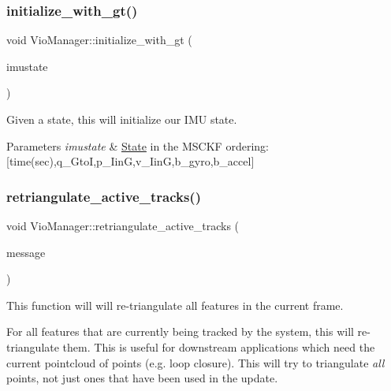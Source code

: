 \subsubsection{\texorpdfstring{initialize\+\_\+with\+\_\+gt()}{initialize\_with\_gt()}}
{\footnotesize\ttfamily void Vio\+Manager\+::initialize\+\_\+with\+\_\+gt (\begin{DoxyParamCaption}\item[{Eigen\+::\+Matrix$<$ double, 17, 1 $>$}]{imustate }\end{DoxyParamCaption})}



Given a state, this will initialize our I\+MU state. 


\begin{DoxyParams}{Parameters}
{\em imustate} & \hyperlink{classov__msckf_1_1State}{State} in the M\+S\+C\+KF ordering\+: \mbox{[}time(sec),q\+\_\+\+GtoI,p\+\_\+\+IinG,v\+\_\+\+IinG,b\+\_\+gyro,b\+\_\+accel\mbox{]} \\
\hline
\end{DoxyParams}
\mbox{\label{classov__msckf_1_1VioManager_ac3259add6e59f191388dfe989d668759}} 
\subsubsection{\texorpdfstring{retriangulate\+\_\+active\+\_\+tracks()}{retriangulate\_active\_tracks()}}
{\footnotesize\ttfamily void Vio\+Manager\+::retriangulate\+\_\+active\+\_\+tracks (\begin{DoxyParamCaption}\item[{const \hyperlink{structov__core_1_1CameraData}{ov\+\_\+core\+::\+Camera\+Data} \&}]{message }\end{DoxyParamCaption})\hspace{0.3cm}{\ttfamily [protected]}}



This function will will re-\/triangulate all features in the current frame. 

For all features that are currently being tracked by the system, this will re-\/triangulate them. This is useful for downstream applications which need the current pointcloud of points (e.\+g. loop closure). This will try to triangulate {\itshape all} points, not just ones that have been used in the update.


